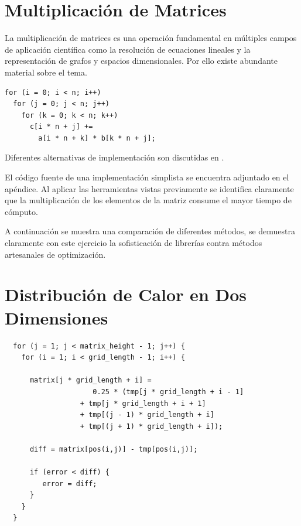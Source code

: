 \documentclass[a4paper]{report}
\begin{document}
\section{Multiplicaci\'on de Matrices}

La multiplicaci\'on de matrices es una operaci\'on fundamental en m\'ultiples
campos de aplicaci\'on cient\'ifica como la resoluci\'on de ecuaciones
lineales y la representaci\'on de grafos y espacios dimensionales. Por ello
existe abundante material sobre el tema.

\begin{verbatim}
for (i = 0; i < n; i++)
  for (j = 0; j < n; j++)
    for (k = 0; k < n; k++)
      c[i * n + j] += 
        a[i * n + k] * b[k * n + j];
\end{verbatim}

Diferentes alternativas de implementaci\'on son discutidas en
\cite{mm-matrixmultiplicationtool}.

\bigskip

El c\'odigo fuente de una implementaci\'on simplista se encuentra adjuntado en
el ap\'endice. Al aplicar las herramientas vistas previamente se identifica
claramente que la multiplicaci\'on de los elementos de la matriz consume el
mayor tiempo de c\'omputo.

\bigskip



\bigskip

A continuaci\'on se muestra una comparaci\'on de diferentes m\'etodos, se
demuestra claramente con este ejercicio la sofisticaci\'on de librer\'ias
contra m\'etodos artesanales de optimizaci\'on.

\section{Distribuci\'on de Calor en Dos Dimensiones}

\begin{verbatim}
  for (j = 1; j < matrix_height - 1; j++) {
    for (i = 1; i < grid_length - 1; i++) {
      
      matrix[j * grid_length + i] = 
                     0.25 * (tmp[j * grid_length + i - 1]
                  + tmp[j * grid_length + i + 1]
                  + tmp[(j - 1) * grid_length + i]
                  + tmp[(j + 1) * grid_length + i]);

      diff = matrix[pos(i,j)] - tmp[pos(i,j)];

      if (error < diff) {
         error = diff;
      }
    }
  }
\end{verbatim}
\end{document}
